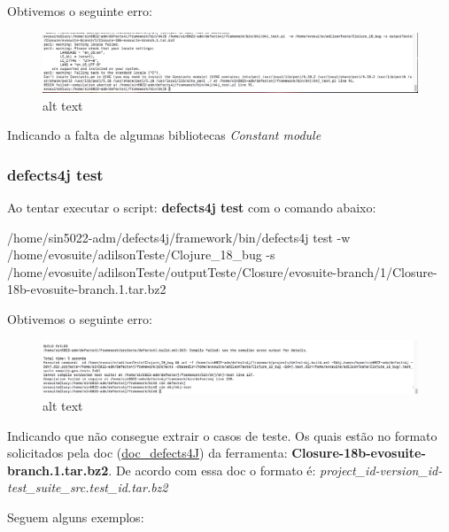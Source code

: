\documentclass[11pt]{article}
\makeatletter
\def\maxwidth{\ifdim\Gin@nat@width>\linewidth\linewidth
    \else\Gin@nat@width\fi}
\let\Oldincludegraphics\includegraphics
\renewcommand{\includegraphics}[1]{\Oldincludegraphics[width=.8\maxwidth]{#1}}
\newenvironment{Shaded}{}{}
\newcommand{\NormalTok}[1]{{#1}}
\newcommand{\ExtensionTok}[1]{{#1}}
\makeatother
\begin{document}
    Obtivemos o seguinte erro:

    \begin{figure}
\centering
\includegraphics{pic/d4j_testpl.png}
\caption{alt text}
\end{figure}

    Indicando a falta de algumas bibliotecas \emph{Constant module}

    \hypertarget{defects4j-test}{%
\subsubsection{defects4j test}\label{defects4j-test}}

    Ao tentar executar o script: \textbf{defects4j test} com o comando
abaixo:

    \begin{Shaded}
\begin{Highlighting}[]
\ExtensionTok{/home/sin5022-adm/defects4j/framework/bin/defects4j}\NormalTok{ test -w /home/evosuite/adilsonTeste/Clojure_18_bug -s /home/evosuite/adilsonTeste/outputTeste/Closure/evosuite-branch/1/Closure-18b-evosuite-branch.1.tar.bz2}
\end{Highlighting}
\end{Shaded}

    Obtivemos o seguinte erro:

    \begin{figure}
\centering
\includegraphics{pic/defects4j_test.png}
\caption{alt text}
\end{figure}

    Indicando que não consegue extrair o casos de teste. Os quais estão no
formato solicitados pela doc
(\href{https://people.cs.umass.edu/~rjust/defects4j/html_doc/d4j/d4j-test.html}{doc\_defects4J})
da ferramenta: \textbf{Closure-18b-evosuite-branch.1.tar.bz2}. De acordo
com essa doc o formato é:
\emph{project\_id-version\_id-test\_suite\_src.test\_id.tar.bz2}

    Seguem alguns exemplos:
\end{document}
